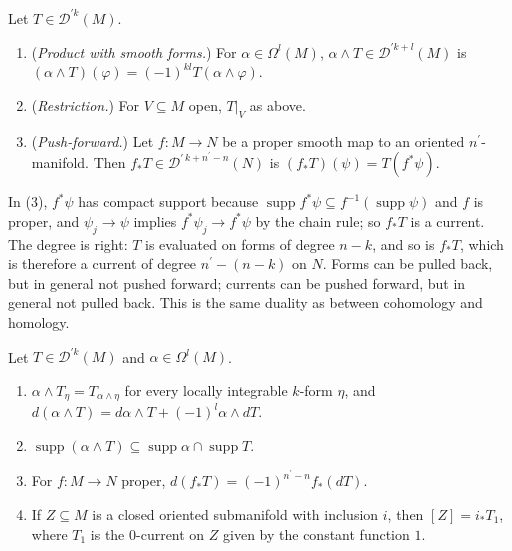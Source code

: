 \begin{definition}\label{currents:definition-current-operations}
Let $T \in \mathcal{D}^{\prime k}(M)$.
\begin{enumerate}
\item (\emph{Product with smooth forms.}) For $\alpha \in \Omega^l(M)$, $\alpha \wedge T \in \mathcal{D}^{\prime k+l}(M)$ is $(\alpha \wedge T)(\varphi) = (-1)^{kl}T(\alpha \wedge \varphi)$.
\item (\emph{Restriction.}) For $V \subseteq M$ open, $T|_V$ as above.
\item (\emph{Push-forward.}) Let $f \colon M \to N$ be a proper smooth map to an oriented $n^{\prime}$-manifold. Then $f_*T \in \mathcal{D}^{\prime\, k + n^{\prime} - n}(N)$ is $(f_*T)(\psi) = T(f^*\psi)$.
\end{enumerate}
\end{definition}

In (3), $f^*\psi$ has compact support because $\operatorname{supp}f^*\psi \subseteq f^{-1}(\operatorname{supp}\psi)$ and $f$ is proper, and $\psi_j \to \psi$ implies $f^*\psi_j \to f^*\psi$ by the chain
rule; so $f_*T$ is a current. The degree is right: $T$ is evaluated on forms of degree $n - k$, and so is $f_*T$, which is therefore a current of degree $n^{\prime} - (n - k)$ on $N$. Forms can be pulled
back, but in general not pushed forward; currents can be pushed forward, but in general not pulled back. This is the same duality as between cohomology and homology.

\begin{proposition}\label{currents:proposition-current-operations}
Let $T \in \mathcal{D}^{\prime k}(M)$ and $\alpha \in \Omega^l(M)$.
\begin{enumerate}
\item $\alpha \wedge T_\eta = T_{\alpha \wedge \eta}$ for every locally integrable $k$-form $\eta$, and $d(\alpha \wedge T) = d\alpha \wedge T + (-1)^l\alpha \wedge dT$.
\item $\operatorname{supp}(\alpha \wedge T) \subseteq \operatorname{supp}\alpha \cap \operatorname{supp}T$.
\item For $f \colon M \to N$ proper, $d(f_*T) = (-1)^{n^{\prime} - n}f_*(dT)$.
\item If $Z \subseteq M$ is a closed oriented submanifold with inclusion $i$, then $[Z] = i_*T_1$, where $T_1$ is the $0$-current on $Z$ given by the constant function $1$.
\end{enumerate}
\end{proposition}

